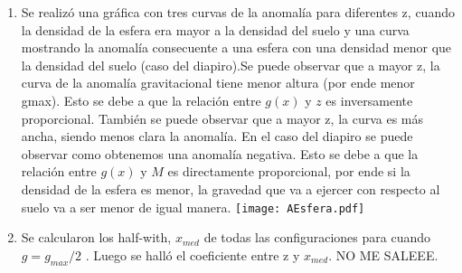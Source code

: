 \documentclass{article}
\begin{document}
\begin{enumerate}
\begin{enumerate}
	\item Se realiz\'o una gr\'afica con tres curvas de la anomal\'ia para diferentes z, cuando la densidad de la esfera era mayor a la densidad del suelo y una curva mostrando la anomal\'ia consecuente a una esfera con una densidad menor que la densidad del suelo (caso del diapiro).Se puede observar que a mayor z, la curva de la anomal\'ia gravitacional tiene menor altura (por ende menor gmax). Esto se debe a que la relaci\'on entre $g(x)$ y $z$ es inversamente proporcional. Tambi\'en se puede observar que a mayor z, la curva es m\'as ancha, siendo menos clara la anomal\'ia. En el caso del diapiro se puede observar como obtenemos una anomal\'ia negativa. Esto se debe a que la relaci\'on entre $g(x)$ y $M$ es directamente proporcional, por ende si la densidad de la esfera es menor, la gravedad que va a ejercer con respecto al suelo va a ser menor de igual manera. 
	\texttt{[image: AEsfera.pdf]}
	\item Se calcularon los half-with, $x_{med}$ de todas las configuraciones para cuando $g = g_{max}/2$ . Luego se halló el coeficiente entre z y $x_{med}$. NO ME SALEEE.
	\end{enumerate}


\end{enumerate}
\end{document}
